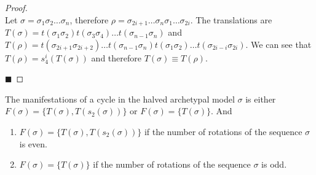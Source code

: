 \begin{proof} \phantom{x} \\
	Let $\sigma = \sigma_1\sigma_2 \dots \sigma_n$, therefore $\rho = \sigma_{2i+1} \dots \sigma_n\sigma_1 \dots \sigma_{2i}$.
	The translations are $T(\sigma) = t(\sigma_1\sigma_2)t(\sigma_3\sigma_4) \dots t(\sigma_{n-1}\sigma_n)$
	and $T(\rho) = t(\sigma_{2i+1}\sigma_{2i+2}) \dots t(\sigma_{n-1}\sigma_n)t(\sigma_1\sigma_2) \dots t(\sigma_{2i-i}\sigma_{2i})$.
	We can see that $T(\rho) = s_4^i(T(\sigma))$ and therefore $T(\sigma) \equiv T(\rho)$.

	\hfill $\blacksquare$
\end{proof}

\clearpage

\begin{theorem}
	\label{theorem:coexistence.even}
	The manifestations of a cycle in the halved archetypal model $\sigma$ is either $F(\sigma) = \{T(\sigma), T(s_2(\sigma))\}$ or $F(\sigma) = \{T(\sigma)\}$.
	And \begin{enumerate}
		\item $F(\sigma) = \{T(\sigma), T(s_2(\sigma))\}$ if the number of rotations of the sequence $\sigma$ is even.
		\item $F(\sigma) = \{T(\sigma)\}$ if the number of rotations of the sequence $\sigma$ is odd.
	\end{enumerate}
\end{theorem}

